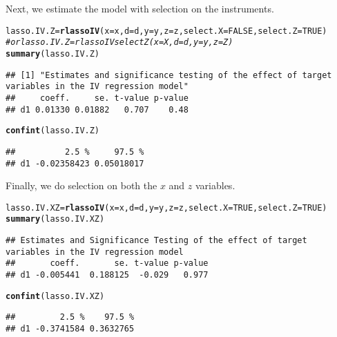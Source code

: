 \documentclass{amsart}\usepackage[]{graphicx}\usepackage[]{color}
\makeatletter
\newcommand{\hlnum}[1]{\textcolor[rgb]{0.686,0.059,0.569}{#1}}%
\newcommand{\hlcom}[1]{\textcolor[rgb]{0.678,0.584,0.686}{\textit{#1}}}%
\newcommand{\hlstd}[1]{\textcolor[rgb]{0.345,0.345,0.345}{#1}}%
\newcommand{\hlkwb}[1]{\textcolor[rgb]{0.69,0.353,0.396}{#1}}%
\newcommand{\hlkwc}[1]{\textcolor[rgb]{0.333,0.667,0.333}{#1}}%
\newcommand{\hlkwd}[1]{\textcolor[rgb]{0.737,0.353,0.396}{\textbf{#1}}}%
\newenvironment{kframe}{%
 \def\at@end@of@kframe{}%
 \ifinner\ifhmode%
  \def\at@end@of@kframe{\end{minipage}}%
  \begin{minipage}{\columnwidth}%
 \fi\fi%
 \def\FrameCommand##1{\hskip\@totalleftmargin \hskip-\fboxsep
 \colorbox{shadecolor}{##1}\hskip-\fboxsep
     \hskip-\linewidth \hskip-\@totalleftmargin \hskip\columnwidth}%
 \MakeFramed {\advance\hsize-\width
   \@totalleftmargin\z@ \linewidth\hsize
   \@setminipage}}%
 {\par\unskip\endMakeFramed%
 \at@end@of@kframe}
\newenvironment{knitrout}{}{} %
\makeatother
\begin{document}
Next, we estimate the model with selection on the instruments. 
\begin{knitrout}
\color{fgcolor}\begin{kframe}
\begin{alltt}
\hlstd{lasso.IV.Z} \hlkwb{=} \hlkwd{rlassoIV}\hlstd{(}\hlkwc{x}\hlstd{=x,} \hlkwc{d}\hlstd{=d,} \hlkwc{y}\hlstd{=y,} \hlkwc{z}\hlstd{=z,} \hlkwc{select.X}\hlstd{=}\hlnum{FALSE}\hlstd{,} \hlkwc{select.Z}\hlstd{=}\hlnum{TRUE}\hlstd{)}
\hlcom{# or lasso.IV.Z = rlassoIVselectZ(x=X, d=d, y=y, z=Z) }
\hlkwd{summary}\hlstd{(lasso.IV.Z)}
\end{alltt}
\begin{verbatim}
## [1] "Estimates and significance testing of the effect of target variables in the IV regression model"
##     coeff.     se. t-value p-value
## d1 0.01330 0.01882   0.707    0.48
\end{verbatim}
\begin{alltt}
\hlkwd{confint}\hlstd{(lasso.IV.Z)}
\end{alltt}
\begin{verbatim}
##          2.5 %     97.5 %
## d1 -0.02358423 0.05018017
\end{verbatim}
\end{kframe}
\end{knitrout}


Finally, we do selection on both the $x$ and $z$ variables.
\begin{knitrout}
\color{fgcolor}\begin{kframe}
\begin{alltt}
\hlstd{lasso.IV.XZ} \hlkwb{=} \hlkwd{rlassoIV}\hlstd{(}\hlkwc{x}\hlstd{=x,} \hlkwc{d}\hlstd{=d,} \hlkwc{y}\hlstd{=y,} \hlkwc{z}\hlstd{=z,} \hlkwc{select.X}\hlstd{=}\hlnum{TRUE}\hlstd{,} \hlkwc{select.Z}\hlstd{=}\hlnum{TRUE}\hlstd{)}
\hlkwd{summary}\hlstd{(lasso.IV.XZ)}
\end{alltt}
\begin{verbatim}
## Estimates and Significance Testing of the effect of target variables in the IV regression model 
##       coeff.       se. t-value p-value
## d1 -0.005441  0.188125  -0.029   0.977
\end{verbatim}
\begin{alltt}
\hlkwd{confint}\hlstd{(lasso.IV.XZ)}
\end{alltt}
\begin{verbatim}
##         2.5 %    97.5 %
## d1 -0.3741584 0.3632765
\end{verbatim}
\end{kframe}
\end{knitrout}
\end{document}
